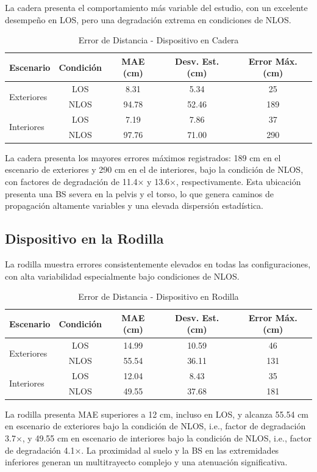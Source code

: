 La cadera presenta el comportamiento más variable del estudio, con un excelente desempeño en LOS, pero una degradación extrema en condiciones de NLOS.
%
\begin{table}[t]
\centering
\caption{Error de Distancia - Dispositivo en Cadera}
\label{tab:error_cadera}
\begin{tabular}{lcccc}
\toprule
\rowcolor{headerblue}
\textbf{Escenario} & \textbf{Condición} & \textbf{MAE (cm)} & \textbf{Desv. Est. (cm)} & \textbf{Error Máx. (cm)} \\
\midrule
\multirow{2}{*}{Exteriores}   & LOS & 8.31 & 5.34 & 25 \\
                            & NLOS & 94.78 & 52.46 & 189 \\
\midrule
\multirow{2}{*}{Interiores}   & LOS & 7.19 & 7.86 & 37 \\
                            & NLOS & 97.76 & 71.00 & 290 \\
\bottomrule
\end{tabular}
\end{table}
%
La cadera presenta los mayores errores máximos registrados: 189 cm en el escenario de exteriores y 290 cm en el de interiores, bajo la condición de NLOS, con factores de degradación de 11.4× y 13.6×, respectivamente. Esta ubicación presenta una BS severa en la pelvis y el torso, lo que genera caminos de propagación altamente variables y una elevada dispersión estadística.

\subsection{Dispositivo en la Rodilla}

La rodilla muestra errores consistentemente elevados en todas las configuraciones, con alta variabilidad especialmente bajo condiciones de NLOS.
%
\begin{table}[t]
\centering
\caption{Error de Distancia - Dispositivo en Rodilla}
\label{tab:error_rodilla}
\begin{tabular}{lcccc}
\toprule
\rowcolor{headerblue}
\textbf{Escenario} & \textbf{Condición} & \textbf{MAE (cm)} & \textbf{Desv. Est. (cm)} & \textbf{Error Máx. (cm)} \\
\midrule
\multirow{2}{*}{Exteriores}   & LOS & 14.99 & 10.59 & 46 \\
                            & NLOS & 55.54 & 36.11 & 131 \\
\midrule
\multirow{2}{*}{Interiores}   & LOS & 12.04 & 8.43 & 35 \\
                            & NLOS & 49.55 & 37.68 & 181 \\
\bottomrule
\end{tabular}
\end{table}
%
La rodilla presenta MAE superiores a 12 cm, incluso en LOS, y alcanza 55.54 cm en escenario  de exteriores bajo la condición de NLOS, i.e., factor de degradación 3.7×, y 49.55 cm en escenario de interiores bajo la condición de NLOS, i.e., factor de degradación 4.1×. La proximidad al suelo y la BS en las extremidades inferiores generan un multitrayecto complejo y una atenuación significativa.

